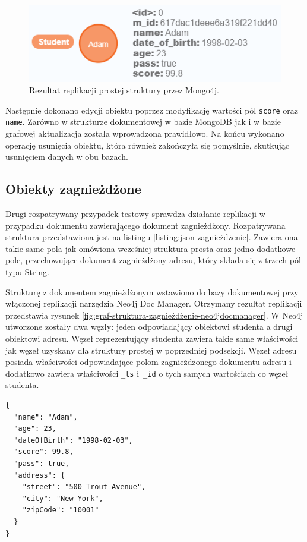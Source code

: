 \documentclass[a4paper,twoside,12pt]{book}
\begin{document}
\begin{figure}[!h]
\centering
\includegraphics[width=12cm]{images/struktura_prosta_mongo4j.png}
\caption{Rezultat replikacji prostej struktury przez Mongo4j.}
\label{fig:graf-struktura-prosta-mongo4j}
\end{figure}

Następnie dokonano edycji obiektu poprzez modyfikację wartości pól \texttt{score} oraz \texttt{name}. Zarówno w strukturze dokumentowej w bazie MongoDB jak i w bazie grafowej aktualizacja została wprowadzona prawidłowo. Na końcu wykonano operację usunięcia obiektu, która również zakończyła się pomyślnie, skutkując usunięciem danych w obu bazach. 

\subsection{Obiekty zagnieżdżone}

Drugi rozpatrywany przypadek testowy sprawdza działanie replikacji w przypadku dokumentu zawierającego dokument zagnieżdżony. Rozpatrywana struktura przedstawiona jest na listingu \ref{listing:json-zagnieżdżenie}. Zawiera ona takie same pola jak omówiona wcześniej struktura prosta oraz jedno dodatkowe pole, przechowujące dokument zagnieżdżony adresu, który składa się z trzech pól typu String.

Strukturę z dokumentem zagnieżdżonym wstawiono do bazy dokumentowej przy włączonej replikacji narzędzia Neo4j Doc Manager. Otrzymany rezultat replikacji przedstawia rysunek \ref{fig:graf-struktura-zagnieżdżenie-neo4jdocmanager}. W Neo4j utworzone zostały dwa węzły: jeden odpowiadający obiektowi studenta a drugi obiektowi adresu. Węzeł reprezentujący studenta zawiera takie same właściwości jak węzeł uzyskany dla struktury prostej w poprzedniej podsekcji. Węzeł adresu posiada właściwości odpowiadające polom zagnieżdżonego dokumentu adresu i dodatkowo zawiera właściwości \texttt{\_ts} i~\texttt{\_id} o tych samych wartościach co węzeł studenta. 

\begin{lstlisting}[style=JSON, caption={Struktura dokumentu z obiektem zagnieżdżonym.}, label={listing:json-zagnieżdżenie}, captionpos=b]
{
  "name": "Adam",
  "age": 23,
  "dateOfBirth": "1998-02-03",
  "score": 99.8,
  "pass": true,
  "address": {
    "street": "500 Trout Avenue",
    "city": "New York",
    "zipCode": "10001"
  }
}
\end{lstlisting}
\end{document}
